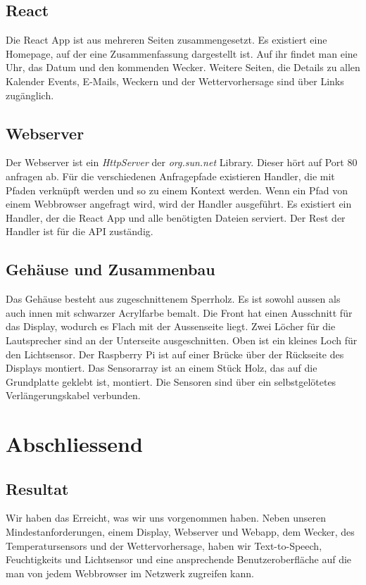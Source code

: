 \documentclass[11pt,a4paper]{article}
\begin{document}
\subsection{React}
Die React App ist aus mehreren Seiten zusammengesetzt. Es existiert eine Homepage, auf der eine Zusammenfassung dargestellt ist. Auf ihr findet man eine Uhr, das Datum und den kommenden Wecker. Weitere Seiten, die Details zu allen Kalender Events, E-Mails, Weckern und der Wettervorhersage sind über Links zugänglich.

\subsection{Webserver}
Der Webserver ist ein \textit{HttpServer} der \textit{org.sun.net} Library. Dieser hört auf Port 80 anfragen ab. Für die verschiedenen Anfragepfade existieren Handler, die mit Pfaden verknüpft werden und so zu einem Kontext werden. Wenn ein Pfad von einem Webbrowser angefragt wird, wird der Handler ausgeführt. Es existiert ein Handler, der die React App und alle benötigten Dateien serviert. Der Rest der Handler ist für die API zuständig.

\subsection{Gehäuse und Zusammenbau}
Das Gehäuse besteht aus zugeschnittenem Sperrholz. Es ist sowohl aussen als auch innen mit schwarzer Acrylfarbe bemalt. Die Front hat einen Ausschnitt für das Display, wodurch es Flach mit der Aussenseite liegt. Zwei Löcher für die Lautsprecher sind an der Unterseite ausgeschnitten. Oben ist ein kleines Loch für den Lichtsensor. Der Raspberry Pi ist auf einer Brücke über der Rückseite des Displays montiert. Das Sensorarray ist an einem Stück Holz, das auf die Grundplatte geklebt ist, montiert. Die Sensoren sind über ein selbstgelötetes Verlängerungskabel verbunden.

\section{Abschliessend}
\subsection{Resultat}
Wir haben das Erreicht, was wir uns vorgenommen haben. Neben unseren Mindestanforderungen, einem Display, Webserver und Webapp, dem Wecker, des Temperatursensors und der Wettervorhersage, haben wir Text-to-Speech, Feuchtigkeits und Lichtsensor und eine ansprechende Benutzeroberfläche auf die man von jedem Webbrowser im Netzwerk zugreifen kann.
\end{document}
